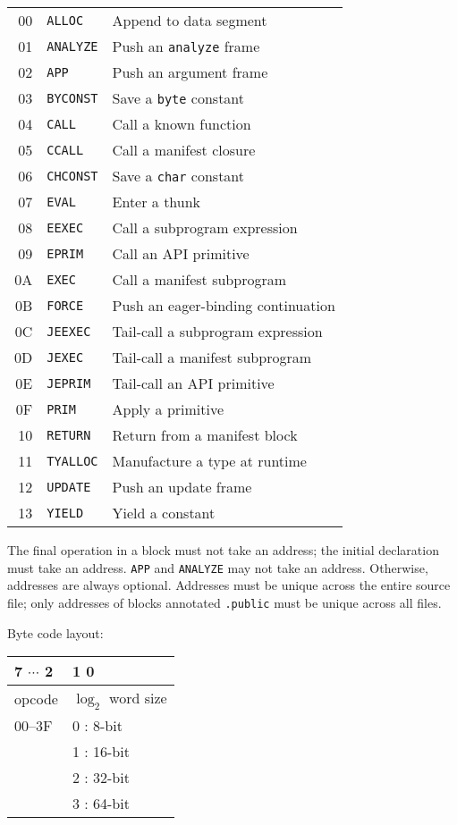 \documentclass{article}
\begin{document}
\begin{tabular}{rl@{ --- }l}
  00 & \texttt{ALLOC} & Append to data segment \\
  01 & \texttt{ANALYZE} & Push an \texttt{analyze} frame \\
  02 & \texttt{APP} & Push an argument frame \\
  03 & \texttt{BYCONST} & Save a \texttt{byte} constant \\
  04 & \texttt{CALL} & Call a known function \\
  05 & \texttt{CCALL} & Call a manifest closure \\
  06 & \texttt{CHCONST} & Save a \texttt{char} constant \\
  07 & \texttt{EVAL} & Enter a thunk \\
  08 & \texttt{EEXEC} & Call a subprogram expression \\
  09 & \texttt{EPRIM} & Call an API primitive \\
  0A & \texttt{EXEC} & Call a manifest subprogram \\
  0B & \texttt{FORCE} & Push an eager-binding continuation \\
  0C & \texttt{JEEXEC} & Tail-call a subprogram expression \\
  0D & \texttt{JEXEC} & Tail-call a manifest subprogram \\
  0E & \texttt{JEPRIM} & Tail-call an API primitive \\
  0F & \texttt{PRIM} & Apply a primitive \\
  10 & \texttt{RETURN} & Return from a manifest block \\
  11 & \texttt{TYALLOC} & Manufacture a type at runtime \\
  12 & \texttt{UPDATE} & Push an update frame \\
  13 & \texttt{YIELD} & Yield a constant \\
\end{tabular}

The final operation in a block must not take an address; the initial declaration must take an address.
\texttt{APP} and \texttt{ANALYZE} may not take an address.
Otherwise, addresses are always optional.
Addresses must be unique across the entire source file;
only addresses of blocks annotated \texttt{.public} must be unique across all files.

Byte code layout:

\begin{tabular}{|l|l|}
\hline
  7 $\cdots$ 2 & 1 0 \\
\hline
  opcode & $\log_2$ word size \\
  00--3F & 0 : 8-bit \\
  & 1 : 16-bit \\
  & 2 : 32-bit \\
  & 3 : 64-bit \\
\hline
\end{tabular}
\end{document}

